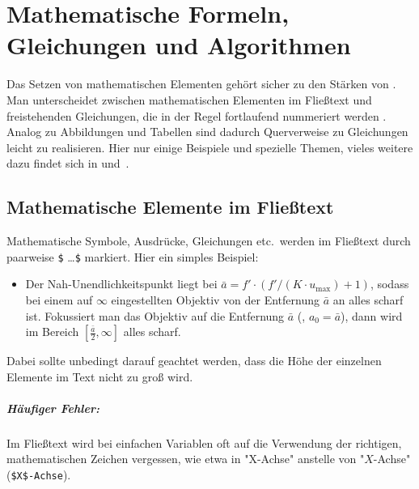 \chapter[Mathem.\ Formeln etc.]{Mathematische Formeln, Gleichungen und Algorithmen}
\label{cha:Mathematik}

Das Setzen von mathematischen Elementen gehört sicher zu den Stär\-ken
von \latex. Man unterscheidet zwischen mathematischen Elementen im Fließtext
und freistehenden Gleichungen, die in der Regel fortlaufend nummeriert werden
. Analog zu Abbildungen und Tabellen sind dadurch Querverweise zu Gleichungen
leicht zu realisieren. Hier nur einige Beispiele und spezielle Themen, vieles
weitere dazu findet sich \zB in \cite[Kap.\ 7]{Kopka2003} und~\cite{Voss2014}.


\section{Mathematische Elemente im Fließtext}

Mathematische Symbole, Ausdrücke, Gleichungen etc.\ werden im Fließtext durch
paarweise \verb!$! \ldots \verb!$! markiert. Hier ein simples Beispiel:
%
\begin{itemize}
	\item[]
	Der Nah-Unendlichkeitspunkt liegt bei
	$\bar{a} = f' \cdot (f' / (K \cdot u_{\max}) + 1)$,
	sodass bei einem auf $\infty$ eingestellten Objektiv von der Entfernung
	$\bar{a}$ an alles scharf ist. Fokussiert man das Objektiv auf die
	Entfernung $\bar{a}$ (\dah, $a_0 = \bar{a}$), dann wird im Bereich
	$[\frac{\bar{a}}{2}, \infty]$ alles scharf.
\end{itemize}
%
Dabei sollte unbedingt darauf geachtet werden, dass die Höhe der einzelnen
Elemente im Text nicht zu groß wird.

\paragraph{Häufiger Fehler:}
Im Fließtext wird bei einfachen Variablen oft auf die Verwendung der richtigen,
mathematischen Zeichen vergessen, wie etwa in "X-Achse" anstelle von "$X$-Achse"
(\verb!$X$-Achse!).


